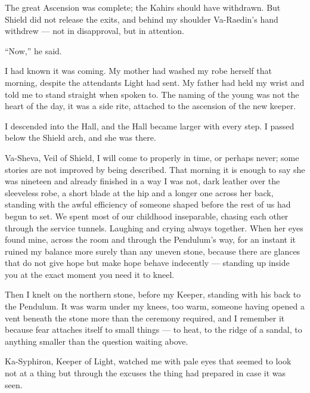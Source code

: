 The great Ascension was complete; the Kahirs should have withdrawn. But Shield did not release the exits, and behind my shoulder Va-Raedin's hand 
withdrew --- not in disapproval, but in attention.\par

``Now,'' he said.\par

I had known it was coming. 
My mother had washed my robe herself that morning, despite the attendants Light had sent. 
My father had held my wrist and told me to stand straight when spoken to. 
The naming of the young was not the heart of the day, it was a side rite, attached to the ascension of the new keeper.\par

I descended into the Hall, and the Hall became larger with every step. 
I passed below the Shield arch, and she was there.\par

Va-Sheva, Veil of Shield, I will come to properly in time, or perhaps never; some stories are not improved by being described. 
That morning it is enough to say she was nineteen and already finished in a way I was not, dark leather over the sleeveless robe, 
a short blade at the hip and a longer one across her back, standing with the awful efficiency of someone shaped before the rest of us had begun to set. 
We spent most of our childhood inseparable, chasing each other through the service tunnels. Laughing and crying always together. 
When her eyes found mine, across the room and through the Pendulum's way, for an instant it ruined my balance more surely than any uneven stone, 
because there are glances that do not give hope but make hope behave indecently --- standing up inside you at the exact moment you need it to kneel.\par

Then I knelt on the northern stone, before my Keeper, standing with his back to the Pendulum. 
It was warm under my knees, too warm, someone having opened a vent beneath the stone more than the ceremony required, 
and I remember it because fear attaches itself to small things --- to heat, to the ridge of a sandal, to anything smaller than the question waiting above.\par

Ka-Syphiron, Keeper of Light, watched me with pale eyes that seemed to look not at a thing but through the excuses the thing had prepared in case it was seen.\par

